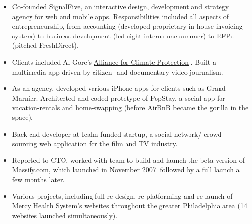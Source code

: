 \documentclass[a4paper,10pt]{memoir} %
\begin{document}
\begin{itemize}
	\item Co-founded SignalFive, an interactive design, development and 
	strategy agency for web and mobile apps. Responsibilities included all 
	aspects of entrepreneurship, from accounting (developed proprietary 
	in-house invoicing system) to business development (led eight interns 
	one summer) to RFPs (pitched FreshDirect).

	\item Clients included Al Gore's \href{https://www.climaterealityproject.org/}{Alliance for Climate Protection}
	. Built a multimedia app driven by citizen- and documentary video journalism.

	\item As an agency, developed various iPhone apps for clients such as 
	Grand Marnier. Architected and coded prototype of PopStay, a social app 
	for vacation-rentals and home-swapping (before AirBnB became the gorilla 
	in the space).
\end{itemize}
\Sep %


\begin{itemize}
	\item Back-end developer at Icahn-funded startup, a social network/
	crowd-sourcing \href{https://www.nytimes.com/2008/03/10/business/media/10massify.html}{web application} for the film and TV industry.
	
	\item Reported to CTO, worked with team to build and launch the beta 
	version of \href{https://www.massify.com}{Massify.com}, which launched 
	in November 2007, followed by a full launch a few months later. 
\end{itemize}
\Sep %

\begin{itemize}
	\item Various projects, including full re-design, re-platforming and 
	re-launch of Mercy Health System's websites throughout the greater 
	Philadelphia area (14 websites launched simultaneously). 
\end{itemize}
\Sep %
\end{document}
